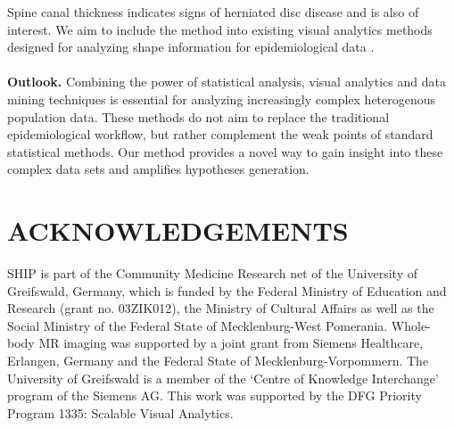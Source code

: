 \documentclass[a4paper,twoside]{style/article}
\begin{document}
Spine canal thickness indicates signs of herniated disc disease and is also of interest.
We aim to include the method into existing visual analytics methods designed for analyzing shape information for epidemiological data \cite{Klemm2014VIS}.
\\\\
\noindent \textbf{Outlook.}
Combining the power of statistical analysis, visual analytics and data mining techniques is essential for analyzing increasingly complex heterogenous population data.
These methods do not aim to replace the traditional epidemiological workflow, but rather complement the weak points of standard statistical methods.
Our method provides a novel way to gain insight into these complex data sets and amplifies hypotheses generation.
\section*{\uppercase{Acknowledgements}}
\begin{small}
\noindent SHIP is part of the Community Medicine Research net of the University of Greifswald, Germany, which is funded by the Federal Ministry of Education and Research (grant no. 03ZIK012), the Ministry of Cultural Affairs as well as the Social Ministry of the Federal State of Mecklenburg-West Pomerania. Whole-body MR imaging was supported by a joint grant from Siemens Healthcare, Erlangen, Germany and the Federal State of Mecklenburg-Vorpommern. The University of Greifswald is a member of the ‘Centre of Knowledge Interchange’ program of the Siemens AG. This work was supported by the DFG Priority Program 1335: Scalable Visual Analytics.
\end{small}



{\small
}


\vfill
\end{document}
